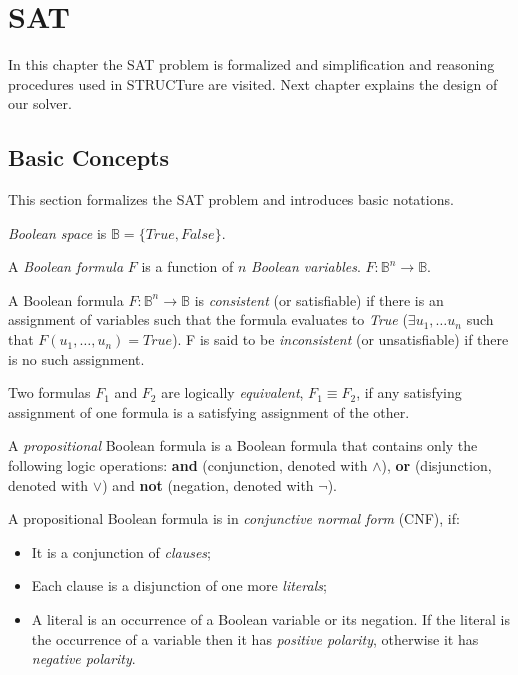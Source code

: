 \chapter{SAT}
\label{chap:sat}

In this chapter the SAT problem is formalized and simplification
and reasoning procedures used in STRUCTure are visited. Next chapter
explains the design of our solver.


\section{Basic Concepts}

This section formalizes the SAT problem and introduces basic notations.

\begin{mydef}
  \emph{Boolean space} is $\mathbb{B} = \{ True, False \}$.
\end{mydef}

\begin{mydef}
  A \emph{Boolean formula} $F$ is a function of $n$ \emph{Boolean variables}.
  $F : \mathbb{B}^n \rightarrow \mathbb{B}$.
\end{mydef}

\begin{mydef}
  A Boolean formula $F : \mathbb{B}^n \rightarrow \mathbb{B}$ is
  \emph{consistent} (or satisfiable) if there is an assignment of
  variables such that the formula evaluates to \emph{True}
  ($\exists u_1, \ldots u_n$ such that $F(u_1, \ldots, u_n) = True$).
  F is said to be \emph{inconsistent} (or unsatisfiable) if
  there is no such assignment.
\end{mydef}

\begin{mydef}
  Two formulas $F_1$ and $F_2$ are logically \emph{equivalent},
  $F_1 \equiv F_2$, if any satisfying assignment of one formula is
  a satisfying assignment of the other.
\end{mydef}

\begin{mydef}
  A \emph{propositional} Boolean formula is a Boolean formula
  that contains only the following logic operations: \textbf{and}
  (conjunction, denoted with $\land$), \textbf{or} (disjunction,
  denoted with $\lor$) and \textbf{not} (negation, denoted with
  $\neg$).
\end{mydef}

A propositional Boolean formula is in \emph{conjunctive normal form}
(CNF), if:
\begin{itemize}
  \item It is a conjunction of \emph{clauses};
  \item Each clause is a disjunction of one more \emph{literals};
  \item A literal is an occurrence of a Boolean variable or its negation.
  If the literal is the occurrence of a variable
  then it has \emph{positive polarity}, otherwise it has \emph{negative
  polarity}.
\end{itemize}

